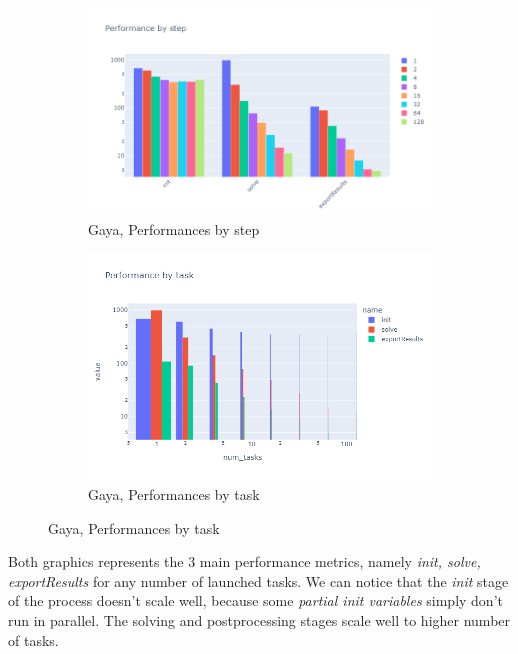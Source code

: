\documentclass[12pt]{article}
\begin{document}
\newpage
\begin{figure}[h]
    \centering
    \begin{subfigure}[b]{0.45\textwidth}
        \centering
        \includegraphics[width=\textwidth]{../illustrations/gaya-graphs/gayaByStep.png}
        \caption{Gaya, Performances by step}
    \end{subfigure}
    \hfill
    \begin{subfigure}[b]{0.45\textwidth}
        \centering
        \includegraphics[width=\textwidth]{../illustrations/gaya-graphs/gayaByTask.png}
        \caption{Gaya, Performances by task}
    \end{subfigure}
\end{figure}

Both graphics represents the 3 main performance metrics, namely \textit{init, solve, exportResults} for any number of launched tasks.
We can notice that the \textit{init} stage of the process doesn't scale well, because some \textit{partial init variables} simply don't run in  parallel.
The solving and postprocessing stages scale well to higher number of tasks.
\end{document}
